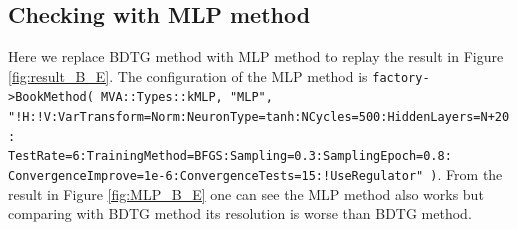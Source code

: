 \subsection{Checking with MLP method}
\label{MLP_check}

Here we replace BDTG method with MLP method to replay the result in Figure \ref{fig:result_B_E}. The configuration of the MLP method is \texttt{factory->BookMethod( MVA::Types::kMLP, "MLP", "!H:!V:VarTransform=Norm:NeuronType=tanh:NCycles=500:HiddenLayers=N+20:\\TestRate=6:TrainingMethod=BFGS:Sampling=0.3:SamplingEpoch=0.8:\\ConvergenceImprove=1e-6:ConvergenceTests=15:!UseRegulator" )}.
From the result in Figure \ref{fig:MLP_B_E} one can see the MLP method also works but comparing with BDTG method its resolution is worse than BDTG method.
